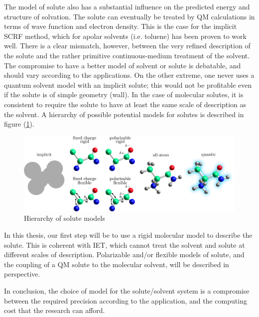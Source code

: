 The model of solute also has a substantial influence on the predicted
energy and structure of solvation. The solute can eventually be treated
by \acs{QM} calculations in terms of wave function and electron density.
This is the case for the implicit SCRF method, which for apolar solvents
(i.e. toluene) has been proven to work well. There is a clear mismatch,
however, between the very refined description of the solute and the
rather primitive continuous-medium treatment of the solvent. The compromise
to have a better model of solvent or solute is debatable, and should
vary according to the applications. On the other extreme, one never
uses a quantum solvent model with an implicit solute; this would not
be profitable even if the solute is of simple geometry (wall). In
the case of molecular solutes, it is consistent to require the solute
to have at least the same scale of description as the solvent. A hierarchy
of possible potential models for solutes is described in figure (\ref{fig:Hierarchy-of-models}).
\begin{figure}[h]
\centering{}%
\noindent\begin{minipage}[t]{1\columnwidth}%
\begin{center}
\includegraphics[width=1\columnwidth]{_figure/solute}
\par\end{center}%
\end{minipage}\caption{Hierarchy of solute models\label{fig:Hierarchy-of-models}}
\end{figure}

In this thesis, our first step will be to use a rigid molecular model
to describe the solute. This is coherent with IET, which cannot treat
the solvent and solute at different scales of description. Polarizable
and/or flexible models of solute, and the coupling of a \acs{QM}
solute to the molecular solvent, will be described in perspective.

In conclusion, the choice of model for the solute/solvent system is
a compromise between the required precision according to the application,
and the computing cost that the research can afford.
